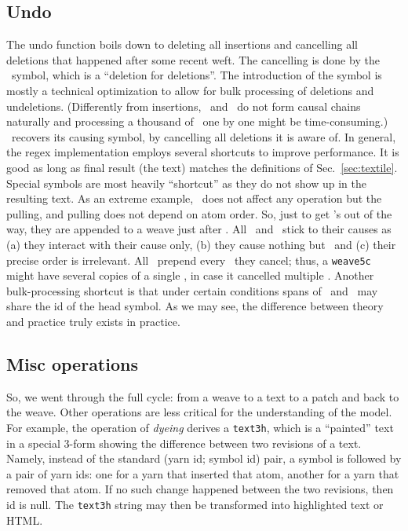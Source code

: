 \documentclass{acm_proc_article-sp}
\begin{document}
\subsection{Undo}	\label{sec:undo}

The undo function boils down to deleting all insertions and cancelling all deletions that happened after some recent weft.
The cancelling is done by the \cnc ~symbol, which is a ``deletion for deletions''.
The introduction of the symbol is mostly a technical optimization to allow for bulk processing of deletions and undeletions. 
(Differently from insertions, \bsp ~and \cnc ~do not form causal chains naturally and processing a thousand of \bsp ~one by one might be time-consuming.)
\cnc ~recovers its causing symbol, by cancelling all deletions it is aware of.
In general, the regex implementation employs several shortcuts to improve performance.
It is good as long as final result (the text) matches the definitions of Sec.~\ref{sec:textile}.
Special symbols are most heavily ``shortcut'' as they do not show up in the resulting text.
As an extreme example, \zero ~does not affect any operation but the pulling, and pulling does not depend on atom order.
So, just to get \zero's out of the way, they are appended to a weave just after \eoa.
All \bsp ~and \cnc ~stick to their causes as (a) they interact with their cause only, (b) they cause nothing but \zero ~and (c) their precise order is irrelevant.
All \cnc ~prepend every \bsp ~they cancel; thus, a {\tt weave5c} might have  several copies of a single \cnc, in case it cancelled multiple \bsp.
Another bulk-processing shortcut is that under certain conditions spans of \bsp ~and \cnc ~may share the id of the head symbol.
As we may see, the difference between theory and practice truly exists in practice.

\subsection{Misc operations}

So, we went through the full cycle: from a weave to a text
to a patch and back to the weave. Other operations are less
critical for the understanding of the model. For example, the
operation of \emph{dyeing} derives a {\tt text3h}, which is a
``painted'' text in a special 3-form showing the difference
between two revisions of a text. Namely, instead of the standard
(yarn id; symbol id) pair, a symbol is followed by a pair
of yarn ids: one for a yarn that inserted that atom,
another for a yarn that removed that atom. If no such
change happened between the two revisions, then id is null.
The {\tt text3h} string may then be transformed into
highlighted text or HTML.
\end{document}
